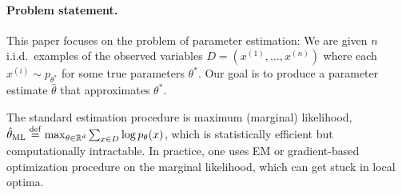 \paragraph{Problem statement.}

This paper focuses on the problem of parameter estimation:
We are given $n$ i.i.d.~examples of the observed variables $D = (x^{(1)}, \dots, x^{(n)})$
where each $x^{(i)} \sim p_{\theta^*}$ for some true parameters $\theta^*$.
Our goal is to produce a parameter estimate $\hat\theta$ that approximates $\theta^*$.

The standard estimation procedure is maximum (marginal) likelihood,
$\hat\theta_\text{\rm ML} \stackrel{\rm def}{=} \max_{\theta \in \mathbb{R}^d} \sum_{x \in D} \log p_\theta(x)$,
which is statistically efficient but computationally intractable.
In practice, one uses EM or gradient-based optimization procedure on the marginal likelihood,
which can get stuck in local optima.


